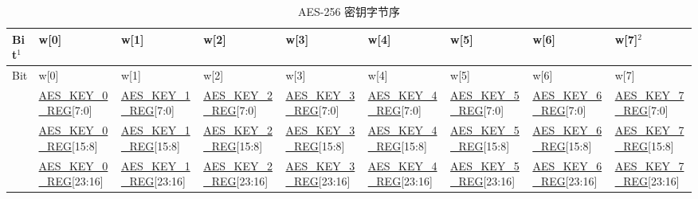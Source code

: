 \documentclass[main\_\_CN.tex]{subfiles}
\begin{document}
\begin{landscape}



    
\begin{threeparttable}

\begin{longtable}[c]
{ |l|l|l|l|l|l|l|l|l|}
\caption{AES-256 密钥字节序}\label{tab:aes-256-key-endian}\\
\hline 
\rowcolor{lightgray}
Bit$^1$ &   w[0]    &   w[1]    &   w[2]    &   w[3]    &   w[4]    &   w[5]&   w[6]    &   w[7]$^2$    \\\hline
\endfirsthead
\hline
\rowcolor{lightgray}
Bit &   w[0]    &   w[1]    &   w[2]    &   w[3]    &   w[4]    &   w[5]&   w[6]    &   w[7]    \\\hline
\endhead
\endfoot
[31:24]     &   \scriptsize \hyperref[regdesc:AESKEYnREG]{AES\_KEY\_0\_REG}[7:0]    &   \scriptsize \hyperref[regdesc:AESKEYnREG]{AES\_KEY\_1\_REG}[7:0]    &   \scriptsize \hyperref[regdesc:AESKEYnREG]{AES\_KEY\_2\_REG}[7:0]    &   \scriptsize \hyperref[regdesc:AESKEYnREG]{AES\_KEY\_3\_REG}[7:0]    &   \scriptsize \hyperref[regdesc:AESKEYnREG]{AES\_KEY\_4\_REG}[7:0]    &   \scriptsize \hyperref[regdesc:AESKEYnREG]{AES\_KEY\_5\_REG}[7:0]
& \scriptsize  \hyperref[regdesc:AESKEYnREG]{AES\_KEY\_6\_REG}[7:0]    &   \scriptsize \hyperref[regdesc:AESKEYnREG]{AES\_KEY\_7\_REG}[7:0]\\ \hline
[23:16]     &   \scriptsize \hyperref[regdesc:AESKEYnREG]{AES\_KEY\_0\_REG}[15:8]   &   \scriptsize \hyperref[regdesc:AESKEYnREG]{AES\_KEY\_1\_REG}[15:8]   &   \scriptsize \hyperref[regdesc:AESKEYnREG]{AES\_KEY\_2\_REG}[15:8]   &   \scriptsize \hyperref[regdesc:AESKEYnREG]{AES\_KEY\_3\_REG}[15:8]   &   \scriptsize \hyperref[regdesc:AESKEYnREG]{AES\_KEY\_4\_REG}[15:8]   &   \scriptsize \hyperref[regdesc:AESKEYnREG]{AES\_KEY\_5\_REG}[15:8]   &   \scriptsize \hyperref[regdesc:AESKEYnREG]{AES\_KEY\_6\_REG}[15:8]   &   \scriptsize \hyperref[regdesc:AESKEYnREG]{AES\_KEY\_7\_REG}[15:8]\\ \hline
[15:8]  &  \scriptsize \hyperref[regdesc:AESKEYnREG]{AES\_KEY\_0\_REG}[23:16]  &   \scriptsize \hyperref[regdesc:AESKEYnREG]{AES\_KEY\_1\_REG}[23:16]  &   \scriptsize \hyperref[regdesc:AESKEYnREG]{AES\_KEY\_2\_REG}[23:16]  &   \scriptsize \hyperref[regdesc:AESKEYnREG]{AES\_KEY\_3\_REG}[23:16]  &   \scriptsize \hyperref[regdesc:AESKEYnREG]{AES\_KEY\_4\_REG}[23:16]  &   \scriptsize \hyperref[regdesc:AESKEYnREG]{AES\_KEY\_5\_REG}[23:16]& \scriptsize \hyperref[regdesc:AESKEYnREG]{AES\_KEY\_6\_REG}[23:16]  &   \scriptsize \hyperref[regdesc:AESKEYnREG]{AES\_KEY\_7\_REG}[23:16]\\ \hline

\end{longtable}
\end{threeparttable}
\end{landscape}
\end{document}
